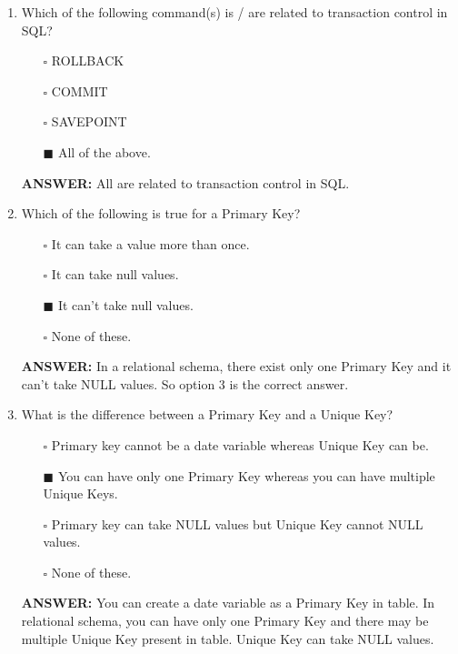 \documentclass[10pt]{article}
\begin{document}
\begin{enumerate}
		\item Which of the following command(s) is /  are related to transaction control in SQL?
			\begin{enumerate}
				\item[$\square$] ROLLBACK
				\item[$\square$] COMMIT
				\item[$\square$] SAVEPOINT
				\item[$\blacksquare$] All of the above.
			\end{enumerate}
			\color{red} \textbf{ANSWER:} \color{black} All are related to transaction control in SQL.

		\item Which of the following is true for a Primary Key?
			\begin{enumerate}
				\item[$\square$] It can take a value more than once.
				\item[$\square$] It can take null values.
				\item[$\blacksquare$] It can’t take null values.
				\item[$\square$] None of these.
			\end{enumerate}
			\color{red} \textbf{ANSWER:} \color{black} In a relational schema, there exist only one Primary Key and it can’t take NULL values. So option 3 is the correct answer.

		\item What is the difference between a Primary Key and a Unique Key?
			\begin{enumerate}
				\item[$\square$] Primary key cannot be a date variable whereas Unique Key can be.
				\item[$\blacksquare$] You can have only one Primary Key whereas you can have multiple Unique Keys.
				\item[$\square$] Primary key can take NULL values but Unique Key cannot NULL values.
				\item[$\square$] None of these.
			\end{enumerate}
			\color{red} \textbf{ANSWER:} \color{black} You can create a date variable as a Primary Key in table. In relational schema, you can have only one Primary Key and there may be multiple Unique Key present in table. Unique Key can take NULL values.

		\newpage


\end{enumerate}
\end{document}
